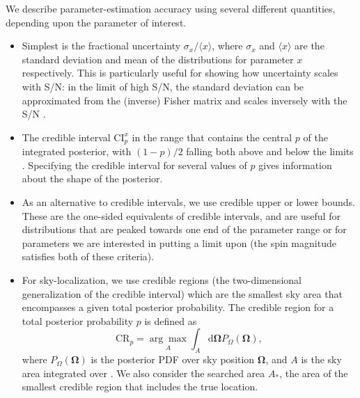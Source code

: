 We describe parameter-estimation accuracy using several different quantities, depending upon the parameter of interest.
\begin{itemize}
\item Simplest is the fractional uncertainty $\sigma_x/\langle x\rangle$, where $\sigma_x$ and $\langle x\rangle$ are the standard deviation and mean of the distributions for parameter $x$ respectively. This is particularly useful for showing how uncertainty scales with S/N: in the limit of high S/N, the standard deviation can be approximated from the (inverse) Fisher matrix and scales inversely with the S/N \citep{Vallisneri_2008}.
\item The credible interval $\mathrm{CI}_p^{x}$ in the range that contains the central $p$ of the integrated posterior, with $(1-p)/2$ falling both above and below the limits \citep{Aasi_2013}. Specifying the credible interval for several values of $p$ gives information about the shape of the posterior.
\item As an alternative to credible intervals, we use credible upper or lower bounds. These are the one-sided equivalents of credible intervals, and are useful for distributions that are peaked towards one end of the parameter range or for parameters we are interested in putting a limit upon (the spin magnitude satisfies both of these criteria).
\item For sky-localization, we use credible regions (the two-dimensional generalization of the credible interval) which are the smallest sky area that encompasses a given total posterior probability. The credible region for a total posterior probability $p$ is defined as
\begin{equation}
\mathrm{CR}_p = \underset{A}{\arg\!\max} \int_A \mathrm{d}\boldsymbol{\Omega} P_{\Omega}(\boldsymbol{\Omega}),
\label{eq:CR}
\end{equation}
where $P_{\Omega}(\boldsymbol{\Omega})$ is the posterior PDF over sky position $\boldsymbol{\Omega}$, and $A$ is the sky area integrated over \citep{Sidery_2014}. We also consider the searched area $A_\ast$, the area of the smallest credible region that includes the true location.
\end{itemize}
  
